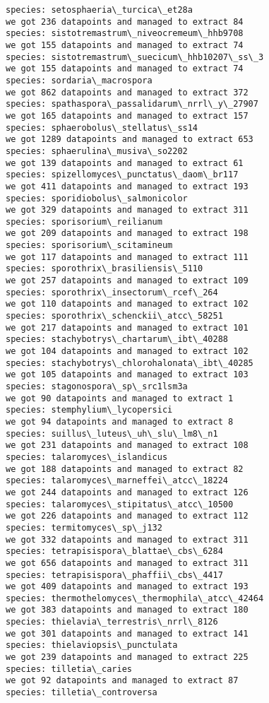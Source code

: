 \documentclass[11pt]{article}
\begin{document}
\begin{Verbatim}[commandchars=\\\{\}]
species: setosphaeria\_turcica\_et28a
we got 236 datapoints and managed to extract 84
species: sistotremastrum\_niveocremeum\_hhb9708
we got 155 datapoints and managed to extract 74
species: sistotremastrum\_suecicum\_hhb10207\_ss\_3
we got 155 datapoints and managed to extract 74
species: sordaria\_macrospora
we got 862 datapoints and managed to extract 372
species: spathaspora\_passalidarum\_nrrl\_y\_27907
we got 165 datapoints and managed to extract 157
species: sphaerobolus\_stellatus\_ss14
we got 1289 datapoints and managed to extract 653
species: sphaerulina\_musiva\_so2202
we got 139 datapoints and managed to extract 61
species: spizellomyces\_punctatus\_daom\_br117
we got 411 datapoints and managed to extract 193
species: sporidiobolus\_salmonicolor
we got 329 datapoints and managed to extract 311
species: sporisorium\_reilianum
we got 209 datapoints and managed to extract 198
species: sporisorium\_scitamineum
we got 117 datapoints and managed to extract 111
species: sporothrix\_brasiliensis\_5110
we got 257 datapoints and managed to extract 109
species: sporothrix\_insectorum\_rcef\_264
we got 110 datapoints and managed to extract 102
species: sporothrix\_schenckii\_atcc\_58251
we got 217 datapoints and managed to extract 101
species: stachybotrys\_chartarum\_ibt\_40288
we got 104 datapoints and managed to extract 102
species: stachybotrys\_chlorohalonata\_ibt\_40285
we got 105 datapoints and managed to extract 103
species: stagonospora\_sp\_src1lsm3a
we got 90 datapoints and managed to extract 1
species: stemphylium\_lycopersici
we got 94 datapoints and managed to extract 8
species: suillus\_luteus\_uh\_slu\_lm8\_n1
we got 231 datapoints and managed to extract 108
species: talaromyces\_islandicus
we got 188 datapoints and managed to extract 82
species: talaromyces\_marneffei\_atcc\_18224
we got 244 datapoints and managed to extract 126
species: talaromyces\_stipitatus\_atcc\_10500
we got 226 datapoints and managed to extract 112
species: termitomyces\_sp\_j132
we got 332 datapoints and managed to extract 311
species: tetrapisispora\_blattae\_cbs\_6284
we got 656 datapoints and managed to extract 311
species: tetrapisispora\_phaffii\_cbs\_4417
we got 409 datapoints and managed to extract 193
species: thermothelomyces\_thermophila\_atcc\_42464
we got 383 datapoints and managed to extract 180
species: thielavia\_terrestris\_nrrl\_8126
we got 301 datapoints and managed to extract 141
species: thielaviopsis\_punctulata
we got 239 datapoints and managed to extract 225
species: tilletia\_caries
we got 92 datapoints and managed to extract 87
species: tilletia\_controversa

\end{Verbatim}
\end{document}
